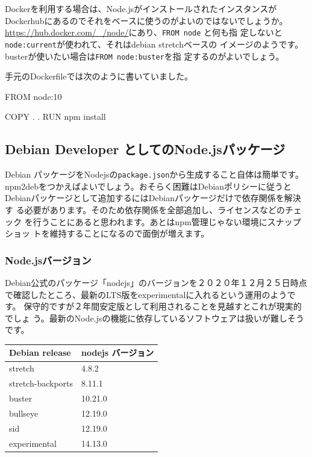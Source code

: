 \documentclass[mingoth,a4paper]{jsarticle}
\begin{document}
Dockerを利用する場合は、Node.jsがインストールされたインスタンスが
Dockerhubにあるのでそれをベースに使うのがよいのではないでしょうか。
\url{https://hub.docker.com/_/node/}にあり、\texttt{FROM node} と何も指
定しないと\texttt{node:current}が使われて、それはdebian stretchベースの
イメージのようです。busterが使いたい場合は\texttt{FROM node:buster}を指
定するのがよいでしょう。

手元のDockerfileでは次のように書いていました。

\begin{commandline}
FROM node:10

COPY . .
RUN npm install
\end{commandline}

\subsection{Debian Developer としてのNode.jsパッケージ}

Debian パッケージをNodejsの\texttt{package.json}から生成すること自体は簡単です。
npm2debをつかえばよいでしょう。おそらく困難はDebianポリシーに従うと
Debianパッケージとして追加するにはDebianパッケージだけで依存関係を解決す
る必要があります。そのため依存関係を全部追加し、ライセンスなどのチェック
を行うことにあると思われます。あとはnpm管理じゃない環境にスナップショッ
トを維持することになるので面倒が増えます。

\subsubsection{Node.jsバージョン}

Debian公式のパッケージ「nodejs」のバージョンを２０２０年１２月２５日時点
で確認したところ、最新のLTS版をexperimentalに入れるという運用のようです。
保守的ですが２年間安定版として利用されることを見越すとこれが現実的でしょ
う。最新のNode.jsの機能に依存しているソフトウェアは扱いが難しそうです。

\begin{tabular}{|l|l|}
Debian release    & nodejs バージョン \\
\hline
stretch           & 4.8.2 \\
stretch-backports & 8.11.1 \\
buster            & 10.21.0 \\
bullseye          & 12.19.0 \\
sid               & 12.19.0 \\
experimental      & 14.13.0 \\
\end{tabular}
\end{document}
